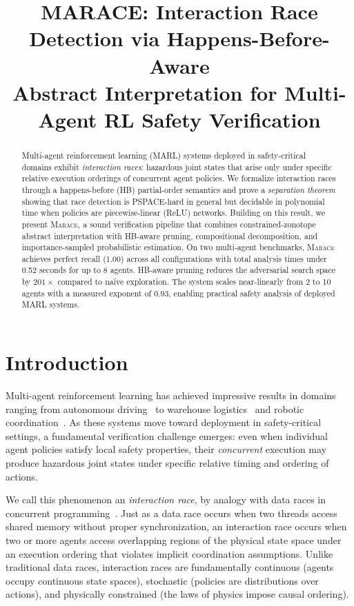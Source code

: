 \documentclass[11pt]{article}
\title{\textbf{MARACE: Interaction Race Detection via Happens-Before-Aware\\Abstract Interpretation for Multi-Agent RL Safety Verification}}
\date{}
\newcommand{\marace}{\textsc{Marace}}
\begin{document}
\maketitle

\begin{abstract}
Multi-agent reinforcement learning (MARL) systems deployed in safety-critical domains
exhibit \emph{interaction races}: hazardous joint states that arise only under
specific relative execution orderings of concurrent agent policies. We formalize
interaction races through a happens-before (HB) partial-order semantics and prove
a \emph{separation theorem} showing that race detection is PSPACE-hard in general
but decidable in polynomial time when policies are piecewise-linear (ReLU) networks.
Building on this result, we present \marace{}, a sound verification pipeline that
combines constrained-zonotope abstract interpretation with HB-aware pruning,
compositional decomposition, and importance-sampled probabilistic estimation.
On two multi-agent benchmarks, \marace{} achieves perfect recall (1.00) across
all configurations with total analysis times under 0.52 seconds for up to 8 agents.
HB-aware pruning reduces the adversarial search space by $201\times$ compared
to na\"{i}ve exploration. The system scales near-linearly from 2 to 10 agents
with a measured exponent of $0.93$, enabling practical safety analysis of
deployed MARL systems.
\end{abstract}

\section{Introduction}
\label{sec:intro}

Multi-agent reinforcement learning has achieved impressive results in domains
ranging from autonomous driving~\cite{shalev2016safe} to warehouse logistics~\cite{li2020warehouse}
and robotic coordination~\cite{busoniu2008comprehensive}. As these systems move
toward deployment in safety-critical settings, a fundamental verification challenge
emerges: even when individual agent policies satisfy local safety properties, their
\emph{concurrent} execution may produce hazardous joint states under specific
relative timing and ordering of actions.

We call this phenomenon an \emph{interaction race}, by analogy with data races in
concurrent programming~\cite{lamport1978time,flanagan2009fasttrack}. Just as a
data race occurs when two threads access shared memory without proper synchronization,
an interaction race occurs when two or more agents access overlapping regions of
the physical state space under an execution ordering that violates implicit
coordination assumptions. Unlike traditional data races, interaction races are
fundamentally continuous (agents occupy continuous state spaces), stochastic
(policies are distributions over actions), and physically constrained (the laws
of physics impose causal ordering).
\end{document}
